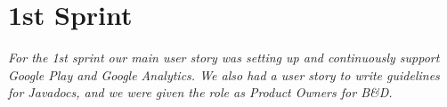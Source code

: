 \chapter{1st Sprint} \label{ChapSprint1}
\textit{For the 1st sprint our main user story was setting up and continuously support Google Play and Google Analytics. We also had a user story to write guidelines for Javadocs, and we were given the role as Product Owners for B\&D.}



